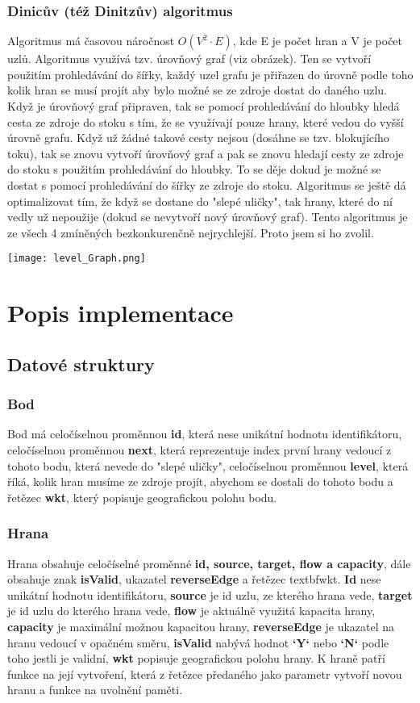 \documentclass[12pt,a4paper]{article}
\begin{document}
	 \subsubsection{Dinicův (též Dinitzův) algoritmus} 
	 Algoritmus má časovou náročnost $O(V^2\cdot E)$, kde E je počet hran a V je počet uzlů. Algoritmus využívá tzv. úrovňový graf (viz obrázek). Ten se vytvoří použitím prohledávání do šířky, každý uzel grafu je přiřazen do úrovně podle toho kolik hran se musí projít aby bylo možné se ze zdroje dostat do daného uzlu. Když je úrovňový graf připraven, tak se pomocí prohledávání do hloubky hledá cesta ze zdroje do stoku s tím, že se využívají pouze hrany, které vedou do vyšší úrovně grafu. Když už žádné takové cesty nejsou (dosáhne se tzv. blokujícího toku), tak se znovu vytvoří úrovňový graf a pak se znovu hledají cesty ze zdroje do stoku s použitím prohledávání do hloubky. To se děje dokud je možné se dostat s pomocí prohledávání do šířky ze zdroje do stoku. Algoritmus se ještě dá optimalizovat tím, že když se dostane do "slepé uličky", tak hrany, které do ní vedly už nepoužije (dokud se nevytvoří nový úrovňový graf). Tento algoritmus je ze všech 4 zmíněných bezkonkurenčně nejrychlejší. Proto jsem si ho zvolil.
	 \bigskip
	 
	 \centerline{\texttt{[image: level\_Graph.png]}}
	 \label{Obrázek 1}
	 \section{Popis implementace}
	 \subsection{Datové struktury}
	 \subsubsection{Bod}
	 Bod má celočíselnou proměnnou \textbf{id}, která nese unikátní hodnotu identifikátoru, celočíselnou proměnnou \textbf{next}, která reprezentuje index první hrany vedoucí z tohoto bodu, která nevede do "slepé uličky", celočíselnou proměnnou \textbf{level}, která říká, kolik hran musíme ze zdroje projít, abychom se dostali do tohoto bodu a řetězec \textbf{wkt}, který popisuje geografickou polohu bodu.
	 \subsubsection{Hrana}
	 Hrana obsahuje celočíselné proměnné \textbf{id, source, target, flow a capacity}, dále obsahuje znak \textbf{isValid}, ukazatel \textbf{reverseEdge} a řetězec textbf{wkt}. \textbf{Id} nese unikátní hodnotu identifikátoru, \textbf{source} je id uzlu, ze kterého hrana vede, \textbf{target} je id uzlu do kterého hrana vede, \textbf{flow} je aktuálně využitá kapacita hrany, \textbf{capacity} je maximální možnou kapacitou hrany, \textbf{reverseEdge} je ukazatel na hranu vedoucí v opačném směru, \textbf{isValid} nabývá hodnot \textbf{‘Y‘} nebo \textbf{‘N‘} podle toho jestli je validní, \textbf{wkt} popisuje geografickou polohu hrany. K hraně patří funkce na její vytvoření, která  z řetězce předaného jako parametr vytvoří novou hranu a funkce na uvolnění paměti.
\end{document}
